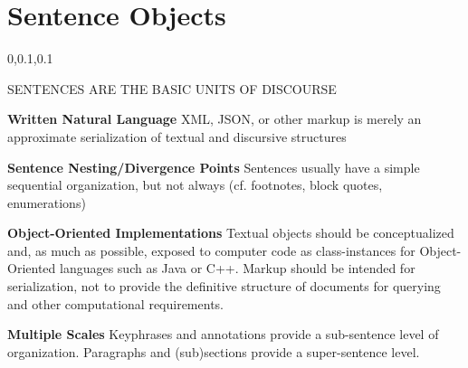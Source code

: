 
\section{Sentence Objects}\fbeg{}\begin{frame}{}

\vspace{-.5em}	

{\Large{}\selectfont
\hspace*{2pt}\begin{minipage}{.96\textwidth}
\vspace{4pt}


		
\begin{lightquadblockc}{0,0.1,0.1}{\parbox{21cm}{\centering \vspace{10pt}SENTENCES ARE THE BASIC UNITS OF DISCOURSE\vspace{3pt}}}
\begin{center}\begin{minipage}{\textwidth}
{\LARGE \setlength{\leftmargini}{30pt}\begin{enumerate}
\dmitem \textbf{Written Natural Language} \hspace{.5em} XML, JSON, or other markup is merely 
an approximate serialization of textual and discursive structures

{\vsp}

\dmitem \textbf{Sentence Nesting/Divergence Points}  \hspace{.5em} Sentences usually have a simple sequential 
organization, but not always (cf. footnotes, block quotes, enumerations)

{\vsp}

\dmitem \textbf{Object-Oriented Implementations}  \hspace{.5em} Textual objects should be 
conceptualized and, as much as possible, exposed to computer code as class-instances 
for Object-Oriented languages such as Java or C++.  Markup should be intended 
for serialization, not to provide the definitive structure of documents for 
querying and other computational requirements.

{\vsp}

\dmitem \textbf{Multiple Scales}  \hspace{.5em} Keyphrases and annotations provide a 
sub-sentence level of organization.  Paragraphs and (sub)sections provide a 
super-sentence level.
\end{enumerate}
}\end{minipage}
\end{center}
\end{lightquadblockc}
\end{minipage}

}

\end{frame}

